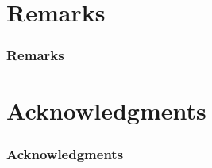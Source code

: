 \documentclass[compress]{beamer}
\begin{document}

%
%
\section{Remarks}\label{Remarks}

\begin{frame}\frametitle{Remarks}
\end{frame}

%
%
\section{Acknowledgments}\label{Acknowledgments}

\begin{frame}\frametitle{Acknowledgments}
\end{frame}

%
%
\end{document}
